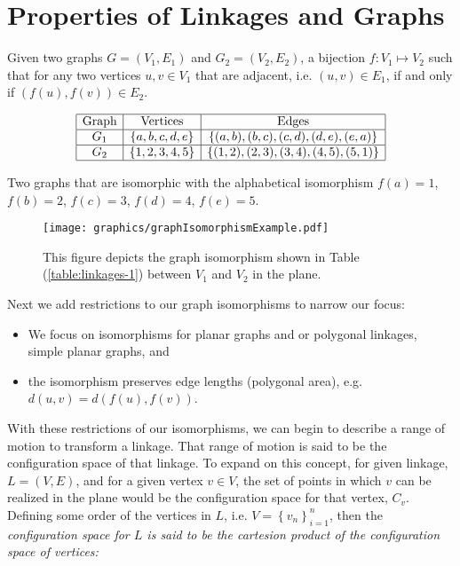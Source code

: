 \section{Properties of Linkages and Graphs}
Given two graphs $G=(V_1,E_1)$ and $G_2 = (V_2,E_2) $, a bijection $f: V_1 \mapsto 
V_2$ 
such that for any two vertices $u,v \in V_1$ that are adjacent, i.e. $(u, v) \in E_1$, if and only 
if $(f(u),f(v)) \in E_2$. 
\begin{table}[!ht]
\begin{center}
$$\begin{array}{|c|c|c|}\hline
\text{Graph}&\text{Vertices}&\text{Edges}\\\hline
G_1&\left\lbrace a,b,c,d,e \right\rbrace & \left\lbrace (a,b),(b,c),(c,d),(d,e),(e,a) \right\rbrace 
\\\hline
G_2&\left\lbrace 1,2,3,4,5 \right\rbrace & \left\lbrace (1,2),(2,3),(3,4),(4,5),(5,1) \right\rbrace 
\\\hline
\end{array} $$
\caption{Two graphs that are isomorphic with the alphabetical isomorphism $f(a)=1$, $f(b)=2$, $f(c) 
= 3$, $f(d)=4$, $f(e)=5$.}
\end{center} 
\label{table:linkages-1}
\end{table} 
\begin{figure}[!h]
\begin{center}
\texttt{[image: graphics/graphIsomorphismExample.pdf]}
\end{center} 
\caption{This figure depicts the graph isomorphism shown in Table 
(\ref{table:linkages-1}) between 
$V_1$ and $V_2$ in the plane.}
\label{fig:configuration-3}
\end{figure}
Next we add restrictions to our graph isomorphisms to narrow our focus:
\begin{itemize}
\item[\rn{1}] We focus on isomorphisms for planar graphs and or polygonal linkages, simple planar 
graphs, and
\item[\rn{2}] the isomorphism preserves edge lengths (polygonal area), e.g. $d(u,v) = d(f(u),f(v))$.
\end{itemize}  
With these restrictions of our isomorphisms, we can begin to describe a range of motion to 
transform a linkage.  That range of motion is said to be the configuration space of that linkage.  
To expand on this concept, for given linkage, $L=(V,E)$, and for a given vertex $v \in V$, the set 
of points in which $v$ can be realized in the plane would be the configuration space for that 
vertex, $C_v$.  Defining some order of the vertices in $L$, i.e. $V = \left\lbrace v_n 
\right\rbrace_{i=1}^n$, then the \it{configuration space} for $L$ is said to be the cartesion 
product of the configuration space of vertices:
